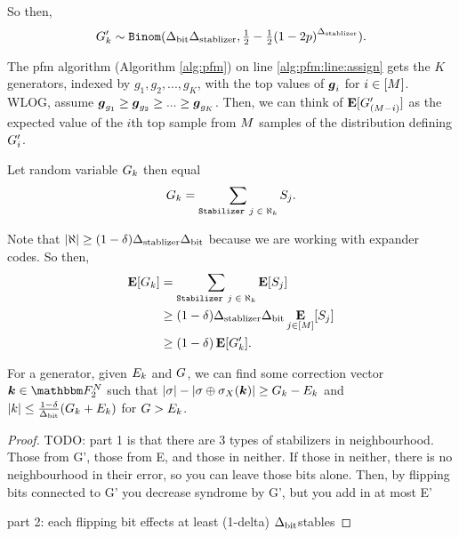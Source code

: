 So then,
$$
	\generatorscoreRV_k \sim \texttt{Binom}(\DegBit \DegStable, \SPr).
$$

The pfm algorithm (Algorithm \ref{alg:pfm}) on line \ref{alg:pfm:line:assign}
gets the $K$ generators, indexed by $g_1, g_2, ..., g_K$, with the top values
of $\boldsymbol{g}_i$ for $i \in [M]$. WLOG, assume
$\boldsymbol{g}_{g_1} \geq \boldsymbol{g}_{g_2} \geq ... \geq \boldsymbol{g}_{g_K}$.
Then, we can think of $\operatorname*{\mathbf{E}}[G'_{{(M - i)}}]$ as the expected value of the $i$th
top sample from $M$ samples of the distribution defining $G'_i$.

Let random variable $G_k$ then equal
$$
	G_k =
		\sum_{\texttt{Stabilizer $j$} \; \in \; \aleph_k} S_j.
$$

Note that $|\aleph| \geq (1 - \delta) {\Delta_{\text{stablizer}}} {\Delta_{\text{bit}}}$ because we are working with expander codes.
So then, \begin{align*}
	\operatorname*{\mathbf{E}}[G_k] &= 
		\sum_{\texttt{Stabilizer $j$} \; \in \; \aleph_k} \operatorname*{\mathbf{E}}[S_j] \\
		&\geq (1 - \delta) {\Delta_{\text{stablizer}}} {\Delta_{\text{bit}}} \operatorname*{\mathbf{E}}_{j \in [M]}[S_j]\\
		&\geq (1 - \delta) \operatorname*{\mathbf{E}}[G'_k].
\end{align*}



\begin{lemma}{For a generator, given $E_k$ and $G$,
\label{lemma:decrby}
	we can find some correction vector $\correctionvec \in \F_2^\NQubits$
	such that \linebreak $|\sigma| - |\sigma \oplus \sigma_X(\boldsymbol{\boldsymbol{k}})| \geq G_k - E_k$}
	and $|k| \leq \frac{1-\delta}{{\Delta_{\text{bit}}}} (G_k + E_k)$ for $G > E_k$.
	\begin{proof}
		TODO:	 part 1 is that there are 3 types of stabilizers in neighbourhood.
		Those from G', those from E, and those in neither. If those in neither, there is no
		neighbourhood in their error, so you can leave those bits alone. Then, by flipping bits
		connected to G' you decrease syndrome by G', but you add in at most E'
		
		part 2: each flipping bit effects at least (1-delta) ${\Delta_{\text{bit}}}$stables
	\end{proof}
\end{lemma}


